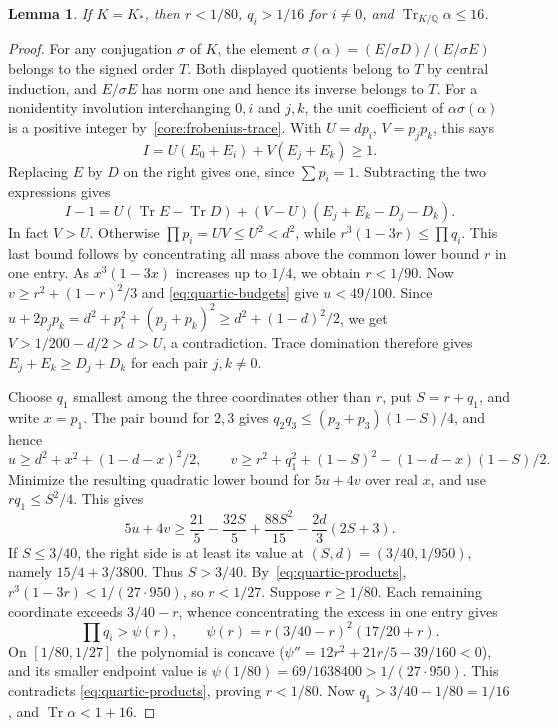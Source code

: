 \documentclass[11pt,a4paper]{article}
\newtheorem{lemma}[theorem]{Lemma}
\theoremstyle{definition}\newtheorem{definition}[theorem]{Definition}
\theoremstyle{remark}\newtheorem{remark}[theorem]{Remark}
\DeclareMathOperator{\Tr}{Tr}
\newcommand{\Q}{\mathbb Q}
\numberwithin{equation}{section}
\begin{document}
\begin{lemma}\label{quart:fixed-trace}
If $K=K_*$, then $r<1/80$, $q_i>1/16$ for $i\ne0$, and
$\Tr_{K/\Q}\alpha\le16$.
\end{lemma}
\begin{proof}
For any conjugation $\sigma$ of $K$, the element
$\sigma(\alpha)=(E/\sigma D)/(E/\sigma E)$ belongs to the signed
order $T$. Both displayed quotients belong to $T$ by central induction,
and $E/\sigma E$ has norm one and hence its inverse belongs to $T$.
For a nonidentity involution interchanging $0,i$ and $j,k$, the
unit coefficient of $\alpha\sigma(\alpha)$ is a positive integer
by~\eqref{core:frobenius-trace}. With $U=dp_i$, $V=p_jp_k$, this says
\[
 I=U(E_0+E_i)+V(E_j+E_k)\ge1.
\]
Replacing $E$ by $D$ on the right gives one, since $\sum p_i=1$.
Subtracting the two expressions gives
\[
 I-1=U(\Tr E-\Tr D)+(V-U)(E_j+E_k-D_j-D_k).
\]
In fact $V>U$. Otherwise $\prod p_i=UV\le U^2<d^2$, while
$r^3(1-3r)\le\prod q_i$. This last bound follows by concentrating
all mass above the common lower bound $r$ in one entry. As
$x^3(1-3x)$ increases up to $1/4$, we obtain $r<1/90$.
Now $v\ge r^2+(1-r)^2/3$ and \eqref{eq:quartic-budgets} give
$u<49/100$. Since
$u+2p_jp_k=d^2+p_i^2+(p_j+p_k)^2\ge d^2+(1-d)^2/2$,
we get $V>1/200-d/2>d>U$, a contradiction. Trace domination
therefore gives $E_j+E_k\ge D_j+D_k$ for each pair $j,k\ne0$.

Choose $q_1$ smallest among the three coordinates other than $r$,
put $S=r+q_1$, and write $x=p_1$. The pair bound for $2,3$ gives
$q_2q_3\le(p_2+p_3)(1-S)/4$, and hence
\[
 u\ge d^2+x^2+(1-d-x)^2/2,\qquad
 v\ge r^2+q_1^2+(1-S)^2-(1-d-x)(1-S)/2.
\]
Minimize the resulting quadratic lower bound for $5u+4v$ over real
$x$, and use $rq_1\le S^2/4$. This gives
\[
 5u+4v\ge\frac{21}5-\frac{32S}5+\frac{88S^2}{15}
             -\frac{2d}{3}(2S+3).
\]
If $S\le3/40$, the right side is at least its value at
$(S,d)=(3/40,1/950)$, namely $15/4+3/3800$. Thus $S>3/40$.
By~\eqref{eq:quartic-products}, $r^3(1-3r)<1/(27\cdot950)$, so
$r<1/27$. Suppose $r\ge1/80$. Each remaining coordinate exceeds
$3/40-r$, whence concentrating the excess in one entry gives
\[
 \prod q_i>\psi(r),\qquad
 \psi(r)=r(3/40-r)^2(17/20+r).
\]
On $[1/80,1/27]$ the polynomial is concave
($\psi''=12r^2+21r/5-39/160<0$), and its smaller endpoint value is
$\psi(1/80)=69/1638400>1/(27\cdot950)$. This contradicts
\eqref{eq:quartic-products}, proving $r<1/80$. Now
$q_1>3/40-1/80=1/16$, and $\Tr\alpha<1+16$.
\end{proof}
\end{document}
